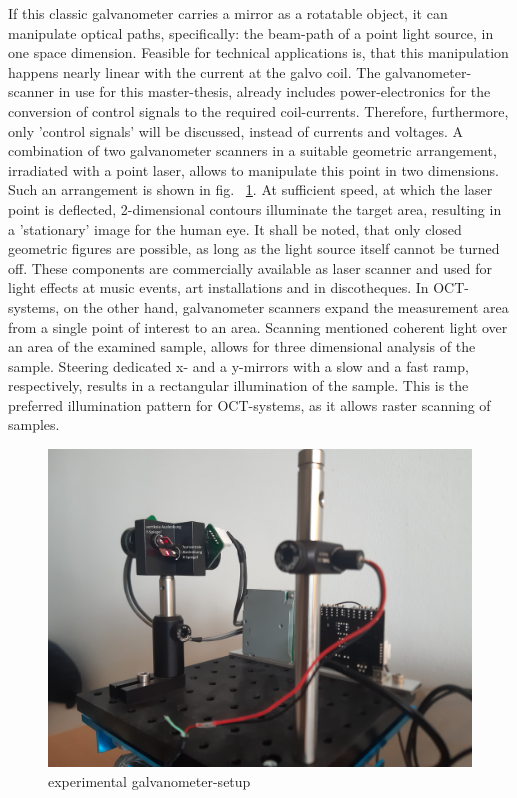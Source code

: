 If this classic galvanometer carries a mirror as a rotatable object, it can manipulate optical paths, specifically: the beam-path of a point light source, in one space dimension. Feasible for technical applications is, that this manipulation happens nearly linear with the current at the galvo coil. The galvanometer-scanner in use for this master-thesis, already includes power-electronics for the conversion of control signals to the required coil-currents. Therefore, furthermore, only 'control signals' will be discussed, instead of currents and voltages. A combination of two galvanometer scanners in a suitable geometric arrangement, irradiated with a point laser, allows to manipulate this point in two dimensions. Such an arrangement is shown in fig. ~\ref{DetailGalvoOn}. At sufficient speed, at which the laser point is deflected, 2-dimensional contours illuminate the target area, resulting in a 'stationary' image for the human eye. It shall be noted, that only closed geometric figures are possible, as long as the light source itself cannot be turned off. These components are commercially available as laser scanner and used for light effects at music events, art installations and in discotheques. In OCT-systems, on the other hand, galvanometer scanners expand the measurement area from a single point of interest to an area. Scanning mentioned coherent light over an area of the examined sample, allows for three dimensional analysis of the sample. Steering  dedicated x- and a y-mirrors with a slow and a fast ramp, respectively, results in a rectangular illumination of the sample. This is the preferred illumination pattern for OCT-systems, as it allows raster scanning of samples.

\begin{figure}[h!]	\centering	\includegraphics[width=\textwidth]{images/DetailGalvoOn.jpg}	\caption{experimental galvanometer-setup}	\label{DetailGalvoOn}	\end{figure}

